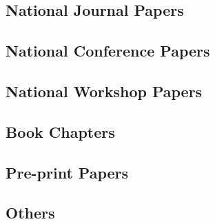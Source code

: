 \subsection{National Journal Papers}

\begin{enumerate}[label=(R{\scriptsize\arabic*}),font=\small\bfseries\color{VioletRed},itemsep=0cm]
    
\end{enumerate}

\subsection{National Conference Papers}

\begin{enumerate}[label=(N{\scriptsize\arabic*}),font=\small\bfseries\color{VioletRed},itemsep=0cm]
    
\end{enumerate}

\subsection{National Workshop Papers}

\begin{enumerate}[label=(A{\scriptsize\arabic*}),font=\small\bfseries\color{VioletRed},itemsep=0cm]
    
\end{enumerate}

\subsection{Book Chapters}

\begin{enumerate}[label=(B{\scriptsize\arabic*}),font=\small\bfseries\color{VioletRed},itemsep=0cm]
    
\end{enumerate}

\subsection{Pre-print Papers}

\begin{enumerate}[label=(P{\scriptsize\arabic*}),font=\small\bfseries\color{VioletRed},itemsep=0cm]
    
\end{enumerate}

\subsection{Others}

\begin{enumerate}[label=(T{\scriptsize\arabic*}),font=\small\bfseries\color{VioletRed},itemsep=0cm]
    
\end{enumerate}